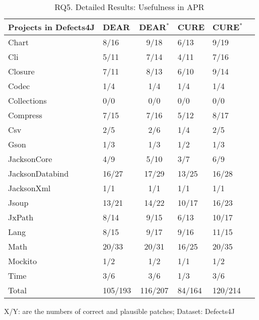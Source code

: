 \begin{table}[t]
	\caption{RQ5. Detailed Results: Usefulness in APR}
	\vspace{-10pt}
	\begin{center}
        \scriptsize
		\renewcommand{\arraystretch}{1} 
		\begin{tabular}{l|p{0.8cm}<{\centering}c|p{0.8cm}<{\centering}p{0.8cm}<{\centering}p{0.8cm}<{\centering}}
		    \hline
		    Projects in Defects4J 	    & DEAR  & DEAR$^{*}$ & CURE  & CURE$^{*}$  \\
		    \hline
		    Chart       	& 8/16  &  9/18      & 6/13     & 9/19         \\
		    Cli        	    & 5/11  &  7/14 	 & 4/11  	  & 7/16         \\
		    Closure     	& 7/11  &  8/13  	 & 6/10   	  & 9/14         \\
		    Codec       	& 1/4   &  1/4  	 & 1/4    	  & 1/4          \\
		    Collections 	& 0/0   &  0/0       & 0/0     	  & 0/0          \\
		    Compress   		& 7/15  &  7/16      & 5/12   	  & 8/17         \\
		    Csv         	& 2/5   &  2/6       & 1/4    	  & 2/5          \\
		    Gson            & 1/3   &  1/3       & 1/2    	  & 1/3          \\
		    JacksonCore     & 4/9   &  5/10      & 3/7     	  & 6/9          \\
		    JacksonDatabind & 16/27 &  17/29     & 13/25  	  & 16/28        \\
		    JacksonXml      & 1/1   &  1/1       & 1/1     	  & 1/1          \\
		    Jsoup           & 13/21 &  14/22     & 10/17  	  & 16/23        \\
		    JxPath          & 8/14  &  9/15      & 6/13   	  & 10/17        \\
		    Lang            & 8/15  &  9/17      & 9/16  	  & 11/15        \\
		    Math            & 20/33 &  20/31     & 16/25  	  & 20/35        \\
		    Mockito         & 1/2   &  1/2       & 1/1    	  & 1/2          \\
		    Time            & 3/6   &  3/6       & 1/3    	  & 3/6          \\
			\hline
			Total           & 105/193  &  116/207  & 84/164       & 120/214         \\
			\hline
		\end{tabular}

{\footnotesize X/Y: are the numbers of correct and plausible patches; Dataset: Defects4J}
		\label{RQ5_2}
	\end{center}
\vspace{-5pt}
\end{table}


